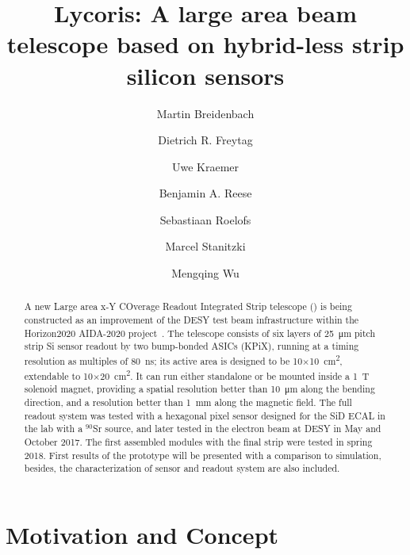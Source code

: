 



\title{{\sc Lycoris}{\bf : A large area beam telescope based on hybrid-less strip silicon sensors}}
\author[3]{Martin Breidenbach}
\author[3]{Dietrich R. Freytag}
\author[1]{Uwe Kraemer}
\author[3]{Benjamin A. Reese}
\author[2,1]{Sebastiaan Roelofs}
\author[1]{Marcel Stanitzki}
\author[1]{Mengqing Wu}
\maketitle

\begin{abstract}

A new Large area x-Y COverage Readout Integrated Strip telescope (\lycoris) is being constructed
as an improvement of the DESY test beam infrastructure within the Horizon2020 AIDA-2020 project~\cite{aida2020}.
The \lycoris telescope consists of six layers of \SI{25}{\micro\metre} pitch strip Si sensor readout by two bump-bonded ASICs (KPiX),
running at a timing resolution as multiples of \SI{80}{\nano\second};
its active area is designed to be 10$\times$\SI{10}{\square\centi\metre}, extendable to 10$\times$\SI{20}{\square\centi\metre}.
It can run either standalone or be mounted inside a \SI{1}{\tesla} solenoid magnet,
providing a spatial resolution better than \SI{10}{\micro\metre} along the bending direction,
and a resolution better than \SI{1}{\milli\metre} along the magnetic field.
The full readout system was tested with a hexagonal pixel sensor designed for the SiD ECAL in the lab with a $^{90}$Sr source,
and later tested in the electron beam at DESY in May and October 2017. The first assembled modules with the final strip were tested in spring 2018.
First results of the \lycoris prototype will be presented with a comparison to simulation,
besides, the characterization of sensor and readout system are also included.
\end{abstract}

\section*{Motivation and Concept}

